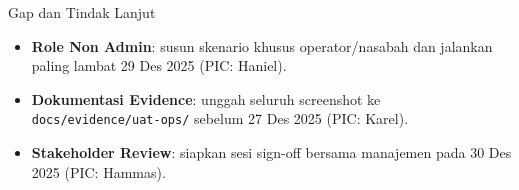 \documentclass[aspectratio=169]{beamer}
\begin{document}
\begin{frame}{Gap dan Tindak Lanjut}
  \begin{itemize}
    \item \textbf{Role Non Admin}: susun skenario khusus operator/nasabah dan jalankan paling lambat 29 Des 2025 (PIC: Haniel).
    \item \textbf{Dokumentasi Evidence}: unggah seluruh screenshot ke \texttt{docs/evidence/uat-ops/} sebelum 27 Des 2025 (PIC: Karel).
    \item \textbf{Stakeholder Review}: siapkan sesi sign-off bersama manajemen pada 30 Des 2025 (PIC: Hammas).
  \end{itemize}
\end{frame}
\end{document}
